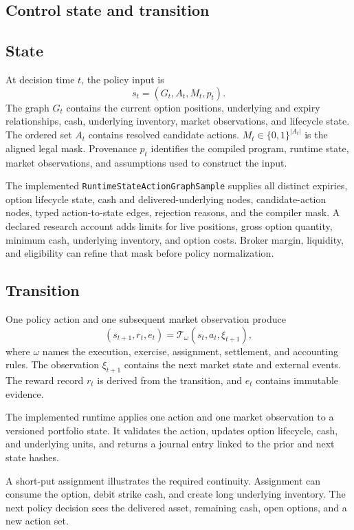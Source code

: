 \documentclass{strategynet-journal}
\begin{document}
\begin{SNcolumns}
\section{Control state and transition}
\label{sec:state}

\subsection{State}

At decision time \(t\), the policy input is
\[
  s_t=(G_t,A_t,M_t,p_t).
\]
The graph \(G_t\) contains the current option positions, underlying and expiry
relationships, cash, underlying inventory, market observations, and lifecycle
state.  The ordered set \(A_t\) contains resolved candidate actions.
\(M_t\in\{0,1\}^{|A_t|}\) is the aligned legal mask.  Provenance \(p_t\)
identifies the compiled program, runtime state, market observations, and
assumptions used to construct the input.

The implemented \texttt{RuntimeStateActionGraphSample} supplies all distinct
expiries, option lifecycle state, cash and delivered-underlying nodes,
candidate-action nodes, typed action-to-state edges, rejection reasons, and
the compiler mask.  A declared research account adds limits for live
positions, gross option quantity, minimum cash, underlying inventory, and
option costs.  Broker margin, liquidity, and eligibility can refine that mask
before policy normalization.

\subsection{Transition}

One policy action and one subsequent market observation produce
\[
  (s_{t+1},r_t,e_t)
  =\mathcal T_{\omega}(s_t,a_t,\xi_{t+1}),
\]
where \(\omega\) names the execution, exercise, assignment, settlement, and
accounting rules.  The observation \(\xi_{t+1}\) contains the next market
state and external events.  The reward record \(r_t\) is derived from the
transition, and \(e_t\) contains immutable evidence.

The implemented runtime applies one action and one market observation to a
versioned portfolio state.  It validates the action, updates option lifecycle,
cash, and underlying units, and returns a journal entry linked to the prior
and next state hashes.

A short-put assignment illustrates the required continuity.  Assignment can
consume the option, debit strike cash, and create long underlying inventory.
The next policy decision sees the delivered asset, remaining cash, open
options, and a new action set.


\end{SNcolumns}
\end{document}
